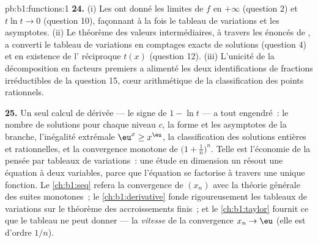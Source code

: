 \begin{solution}{pb:b1:functions:1}
\textbf{24.} (i) Les  ont donné les limites de
$f$ en $+\infty$ (question 2) et $t\ln t \to 0$ (question 10),
façonnant à la fois le tableau de variations et les asymptotes. (ii)
Le théorème des valeurs intermédiaires, à travers les énoncés de
, a converti le tableau de variations en comptages exacts
de solutions (question 4) et en existence de l' réciproque
$t(x)$ (question 12). (iii) L'unicité de la décomposition en facteurs
premiers a alimenté les deux identifications de fractions
irréductibles de la question 15, cœur arithmétique de la
classification des points rationnels.

\textbf{25.} Un seul calcul de dérivée --- le signe de $1 - \ln
t$ --- a tout engendré~: le nombre de solutions pour chaque niveau
$c$, la forme et les asymptotes de la branche, l'inégalité extrémale
$\eu^x \geq x^\eu$, la classification des solutions entières et
rationnelles, et la convergence monotone de $\bigl(1 +
\frac1n\bigr)^n$. Telle est l'économie de la pensée par tableaux de
variations~: une étude en dimension un résout une équation à deux
variables, parce que l'équation se factorise à travers une unique
fonction. Le \cref{ch:b1:seq} refera la convergence de $(x_n)$ avec
la théorie générale des suites monotones~; le \cref{ch:b1:derivative}
fonde rigoureusement les tableaux de variations sur le théorème des
accroissements finis~; et le \cref{ch:b1:taylor} fournit ce que le
tableau ne peut donner --- la \emph{vitesse} de la convergence
$x_n \to \eu$ (elle est d'ordre $1/n$).
\end{solution}
